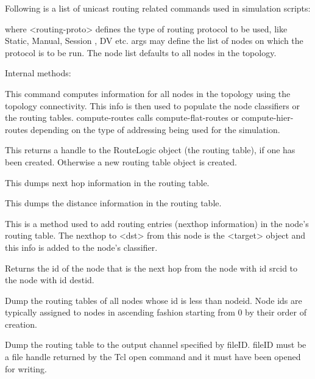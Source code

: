 Following is a list of unicast routing related commands used in simulation
scripts:
\begin{flushleft}

where <routing-proto> defines the type of routing protocol to be used, like
Static, Manual, Session , DV etc. args may define the list of nodes on
which the protocol is to be run. The node list defaults to all nodes in
the topology.

Internal methods:


This command computes  information for all nodes in the
topology using the topology connectivity. This  info is
then used to populate the node classifiers or the routing tables.
compute-routes calls compute-flat-routes or compute-hier-routes depending
on the type of addressing being used for the simulation.


This returns a handle to the RouteLogic object (the routing table),
if one has been created. Otherwise a new routing table object is created.


This dumps next hop information in the routing table.


This dumps the distance information in the routing table.


This is a method used to add routing entries (nexthop information) in
the node's 
routing table. The nexthop to <dst> from this node is the <target> object
and this info is added to the node's classifier.


Returns the id of the node that is the next hop from the node with id
srcid to the node with id destid. 


Dump the routing tables of all nodes whose id is less than nodeid. Node
ids are typically assigned to nodes in ascending fashion starting from 0
by their order of creation. 


Dump the routing table to the output channel specified by fileID. fileID
must be a file handle returned by the Tcl open command and it must have
been opened for writing. 


\end{flushleft}
